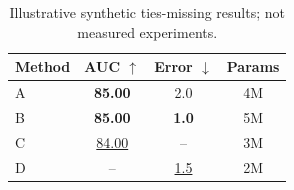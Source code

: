 \documentclass[10pt]{article}
\begin{document}
\begin{table}[t]
\centering
\caption{Illustrative synthetic ties-missing results; not measured experiments.}
\label{tab:ties-missing}
\begin{tabular}{@{}lccc@{}}
\toprule
Method & AUC $\uparrow$ & Error $\downarrow$ & Params \\
\midrule
A & \textbf{85.00} & 2.0 & 4M \\
B & \textbf{85.00} & \textbf{1.0} & 5M \\
C & \underline{84.00} & -- & 3M \\
D & -- & \underline{1.5} & 2M \\
\bottomrule
\end{tabular}
\end{table}
\end{document}

